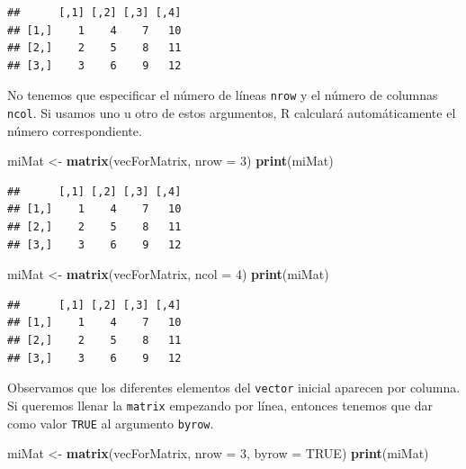 \documentclass[]{book}
\newenvironment{Shaded}{\begin{snugshade}}{\end{snugshade}}
\newcommand{\KeywordTok}[1]{\textcolor[rgb]{0.13,0.29,0.53}{\textbf{#1}}}
\newcommand{\DataTypeTok}[1]{\textcolor[rgb]{0.13,0.29,0.53}{#1}}
\newcommand{\DecValTok}[1]{\textcolor[rgb]{0.00,0.00,0.81}{#1}}
\newcommand{\StringTok}[1]{\textcolor[rgb]{0.31,0.60,0.02}{#1}}
\newcommand{\OtherTok}[1]{\textcolor[rgb]{0.56,0.35,0.01}{#1}}
\newcommand{\NormalTok}[1]{#1}
\begin{document}
\begin{verbatim}
##      [,1] [,2] [,3] [,4]
## [1,]    1    4    7   10
## [2,]    2    5    8   11
## [3,]    3    6    9   12
\end{verbatim}

No tenemos que especificar el número de líneas \texttt{nrow} y el número
de columnas \texttt{ncol}. Si usamos uno u otro de estos argumentos, R
calculará automáticamente el número correspondiente.

\begin{Shaded}
\begin{Highlighting}[]
\NormalTok{miMat <-}\StringTok{ }\KeywordTok{matrix}\NormalTok{(vecForMatrix, }\DataTypeTok{nrow =} \DecValTok{3}\NormalTok{)}
\KeywordTok{print}\NormalTok{(miMat)}
\end{Highlighting}
\end{Shaded}

\begin{verbatim}
##      [,1] [,2] [,3] [,4]
## [1,]    1    4    7   10
## [2,]    2    5    8   11
## [3,]    3    6    9   12
\end{verbatim}

\begin{Shaded}
\begin{Highlighting}[]
\NormalTok{miMat <-}\StringTok{ }\KeywordTok{matrix}\NormalTok{(vecForMatrix, }\DataTypeTok{ncol =} \DecValTok{4}\NormalTok{)}
\KeywordTok{print}\NormalTok{(miMat)}
\end{Highlighting}
\end{Shaded}

\begin{verbatim}
##      [,1] [,2] [,3] [,4]
## [1,]    1    4    7   10
## [2,]    2    5    8   11
## [3,]    3    6    9   12
\end{verbatim}

Observamos que los diferentes elementos del \texttt{vector} inicial
aparecen por columna. Si queremos llenar la \texttt{matrix} empezando
por línea, entonces tenemos que dar como valor \texttt{TRUE} al
argumento \texttt{byrow}.

\begin{Shaded}
\begin{Highlighting}[]
\NormalTok{miMat <-}\StringTok{ }\KeywordTok{matrix}\NormalTok{(vecForMatrix, }\DataTypeTok{nrow =} \DecValTok{3}\NormalTok{, }\DataTypeTok{byrow =} \OtherTok{TRUE}\NormalTok{)}
\KeywordTok{print}\NormalTok{(miMat)}
\end{Highlighting}
\end{Shaded}
\end{document}
